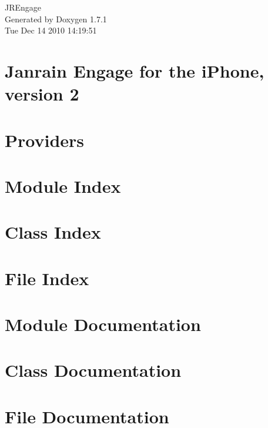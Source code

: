 \documentclass[a4paper]{book}
\begin{document}
\hypersetup{pageanchor=false}
\begin{titlepage}
\vspace*{7cm}
\begin{center}
{\Large JREngage }\\
\vspace*{1cm}
{\large Generated by Doxygen 1.7.1}\\
\vspace*{0.5cm}
{\small Tue Dec 14 2010 14:19:51}\\
\end{center}
\end{titlepage}
\clearemptydoublepage
{}
\tableofcontents
\clearemptydoublepage
{}
\hypersetup{pageanchor=true}
\chapter{Janrain Engage for the iPhone, version 2}
\label{index}\hypertarget{index}{}
\chapter{Providers}
\label{Providers}
\hypertarget{Providers}{}

\chapter{Module Index}

\chapter{Class Index}

\chapter{File Index}

\chapter{Module Documentation}

\chapter{Class Documentation}









\chapter{File Documentation}

\printindex
\end{document}
